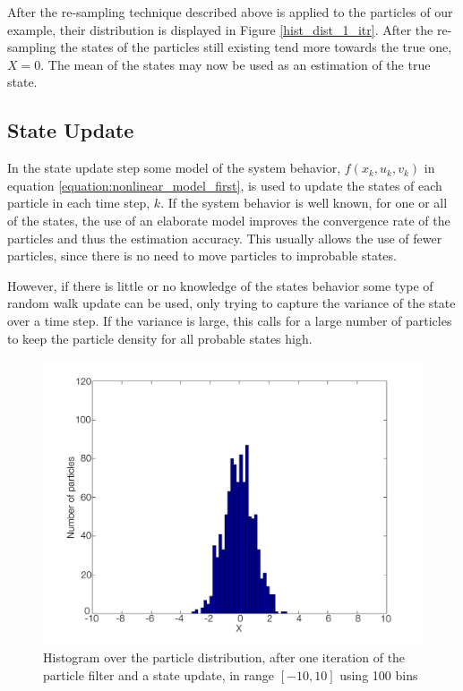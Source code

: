 \documentclass{LTHthesis}
\begin{document}
After the re-sampling technique described above is applied to the particles of our example, their distribution is displayed in Figure \ref{hist_dist_1_itr}. After the re-sampling the states of the particles still existing tend more towards the true one, $X=0$. The mean of the states may now be used as an estimation of the true state.    
% 
\subsection{State Update}
%
In the state update step some model of the system behavior, $f(x_k,u_k,v_k)$ in equation \ref{equation:nonlinear_model_first}, is used to update the states of each particle in each time step, $k$. If the system behavior is well known, for one or all of the states, the use  of an elaborate model improves the convergence rate of the particles and thus the estimation accuracy. This usually allows the use of fewer particles, since there is no need to move particles to improbable states.

However, if there is little or no knowledge of the states behavior some type of random walk update can be used, only trying to capture the variance of the state over a time step. If the variance is large, this calls for a large number of particles to keep the particle density for all probable states high. 
%
\begin{figure}[!hbt]

\includegraphics[width=1\textwidth ]{images/PF/hist_dist_1_itr_dyn}
\caption{Histogram over the particle distribution, after one iteration of the particle filter and a state update, in range $[-10,10]$ using 100 bins}\label{hist_dist_1_itr_dyn}
\end{figure}
\end{document}
